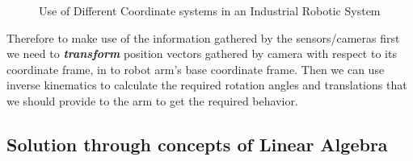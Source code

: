 \documentclass[a4paper,11pt]{article}%
\begin{document}
\begin{figure}[!h]
	\centering
	\hfill
	\caption{Use of Different Coordinate systems in an Industrial Robotic System\cite{pics}}	
\end{figure}

Therefore to make use of the information gathered by the sensors/cameras first we need to \textbf{\textit{transform}} position vectors gathered by camera with respect to its coordinate frame, in to robot arm's base coordinate frame. Then we can use inverse kinematics to calculate the required rotation angles and translations that we should provide to the arm to get the required behavior. 

\subsection{Solution through concepts of Linear Algebra}
\end{document}
